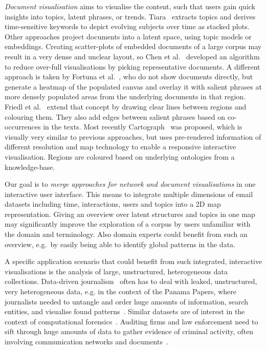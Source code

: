 \textit{Document visualisation} aims to visualise the content, such that users gain quick insights into topics, latent phrases, or trends.
Tiara~\cite{wei2010tiara} extracts topics and derives time-sensitive keywords to depict evolving subjects over time as stacked plots.
Other approaches project documents into a latent space, using topic models or embeddings.
Creating scatter-plots of embedded documents of a large corpus may result in a very dense and unclear layout, so Chen et al.~\cite{chen2009exemplar} developed an algorithm to reduce over-full visualisations by picking representative documents.
A different approach is taken by Fortuna et al.~\cite{fortuna2005visualization}, who do not show documents directly, but generate a heatmap of the populated canvas and overlay it with salient phrases at more densely populated areas from the underlying documents in that region.
Friedl et al.~\cite{fried2014maps} extend that concept by drawing clear lines between regions and colouring them.
They also add edges between salient phrases based on co-occurrences in the texts.
Most recently Cartograph~\cite{sen2017cartograph} was proposed, which is visually very similar to previous approaches, but uses pre-rendered information of different resolution and map technology to enable a responsive interactive visualisation.
Regions are coloured based on underlying ontologies from a knowledge-base.

Our goal is to \textit{merge approaches for network and document visualisations} in one interactive user interface.
This means to integrate multiple dimensions of email datasets including time, interactions, users and topics into a 2D map representation.
Giving an overview over latent structures and topics in one map may significantly improve the exploration of a corpus by users unfamiliar with the domain and terminology.
Also domain experts could benefit from such an overview, e.g.\ by easily being able to identify global patterns in the data.

A specific application scenario that could benefit from such integrated, interactive visualisations is the analysis of large, unstructured, heterogeneous data collections.
Data-driven journalism~\cite{coddington2015clarifying} often has to deal with leaked, unstructured, very heterogeneous data, e.g. in the context of the Panama Papers, where journalists needed to untangle and order huge amounts of information, search entities, and visualise found patterns~\cite{chabin2017panama}.
Similar datasets are of interest in the context of computational forensics~\cite{franke2007computational}.
Auditing firms and law enforcement need to sift through huge amounts of data to gather evidence of criminal activity, often involving communication networks and documents~\cite{karthik2008intelligent}.

